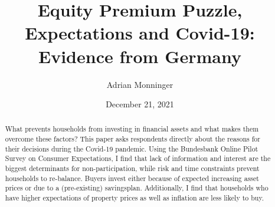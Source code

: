 \documentclass[ProjectABM]{subfiles}
\begin{document}
\providecommand{\versn}{pdf} %
\ifthenelse{\boolean{Web}}{    %
  \renewcommand{\versn}{Web}     %
  \renewcommand{\rootFromOut}{.} %
}{}  %


\title{Equity Premium Puzzle, Expectations and Covid-19:\\ Evidence from Germany}

\author{Adrian Monninger\authNum}




\renewcommand{\forcedate}{December 21, 2021}\date{\forcedate}

\maketitle
\hypertarget{abstract}{}
\begin{abstract}
What prevents households from investing in financial assets and what makes them overcome these factors? This paper asks respondents directly about the reasons for their decisions during the Covid-19 pandemic. Using the Bundesbank Online Pilot Survey on Consumer Expectations, I find that lack of information and interest are the biggest determinants for non-participation, while risk and time constraints prevent households to re-balance. Buyers invest either because of expected increasing asset prices or due to a (pre-existing) savingsplan. Additionally, I find that households who have higher expectations of property prices as well as inflation are less likely to buy.
\end{abstract}


\hypertarget{links}{}

\begin{authorsinfo}
\end{authorsinfo}
\end{document}
